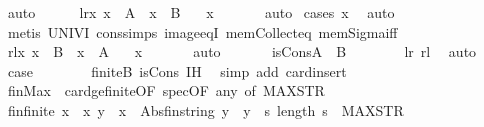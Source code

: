 \begin{isabellebody}
\ auto\isanewline
\ \ \ \ \isamarkupfalse%
\ lr{\isacharcolon}{\isachardoublequoteopen}{\isasymAnd}x{\isachardot}\ x\ {\isasymin}\ {\isacharquery}A\ {\isasymLongrightarrow}\ x\ {\isasymin}\ {\isacharquery}B{\isachardoublequoteclose}\ \isamarkupfalse%
\ \ x\isanewline
\ \ \ \ \ \ \isamarkupfalse%
{\isacharparenleft}auto{\isacharparenright}\ \isamarkupfalse%
{\isacharparenleft}cases\ x{\isacharparenright}\ \isamarkupfalse%
\ auto\ \isanewline
\ \ \ \ \ \ \isamarkupfalse%
\ {\isacharparenleft}metis\ UNIV{\isacharunderscore}I\ cons{\isachardot}simps\ image{\isacharunderscore}eqI\ mem{\isacharunderscore}Collect{\isacharunderscore}eq\ mem{\isacharunderscore}Sigma{\isacharunderscore}iff{\isacharparenright}\ \isamarkupfalse%
\isanewline
\ \ \ \ \isamarkupfalse%
\ rl{\isacharcolon}{\isachardoublequoteopen}{\isasymAnd}x{\isachardot}\ x\ {\isasymin}\ {\isacharquery}B\ {\isasymLongrightarrow}\ x\ {\isasymin}\ {\isacharquery}A{\isachardoublequoteclose}\ \isamarkupfalse%
\ \ x\isanewline
\ \ \ \ \ \ \isamarkupfalse%
{\isacharparenleft}auto{\isacharparenright}\ \isamarkupfalse%
\isanewline
\ \ \ \ \isamarkupfalse%
\ isCons{\isacharcolon}{\isachardoublequoteopen}{\isacharquery}A\ {\isacharequal}\ {\isacharquery}B{\isachardoublequoteclose}\isanewline
\ \ \ \ \ \ \isamarkupfalse%
\ lr\ rl\ \isamarkupfalse%
\ auto\isanewline
\ \ \isamarkupfalse%
\ {\isacharquery}case\isanewline
\ \ \ \ \ \ \isamarkupfalse%
\ finiteB\ isCons\ IH\ \isamarkupfalse%
\ {\isacharparenleft}simp\ add{\isacharcolon}\ card{\isacharunderscore}insert{\isacharparenright}\isanewline
\ \ \isamarkupfalse%
\isanewline
\ \ \isamarkupfalse%
\ \isanewline
\ \ \isamarkupfalse%
\ finMax\ {\isacharequal}\ card{\isacharunderscore}ge{\isacharunderscore}{}{\isacharunderscore}finite{\isacharbrackleft}OF\ spec{\isacharbrackleft}OF\ any{\isacharcomma}\ of\ MAX{\isacharunderscore}STR{\isacharbrackright}{\isacharbrackright}\isanewline
\ \ \isamarkupfalse%
\ fin{\isacharcolon}{\isachardoublequoteopen}finite\ {\isacharbraceleft}x\ {\isacharbar}\ x\ y\ {\isachardot}\ x\ {\isacharequal}\ Abs{\isacharunderscore}fin{\isacharunderscore}string\ y\ {\isasymand}\ y\ {\isasymin}\ {\isacharbraceleft}s{\isachardot}\ length\ s\ {\isasymle}\ MAX{\isacharunderscore}STR{\isacharbraceright}{\isacharbraceright}{\isachardoublequoteclose}\isanewline

\end{isabellebody}
